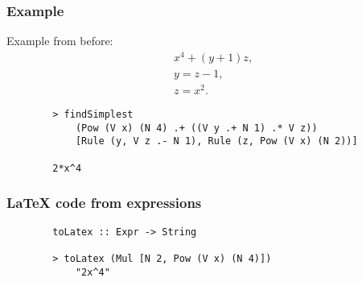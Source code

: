 \documentclass[english, 12pt, t, aspectratio=169]{beamer}
\begin{document}
\begin{frame}[fragile]
	\frametitle{Example}

	Example from before:
	\begin{align}
		&x^4 + (y + 1) z, \\
		&y = z - 1,\\
		&z = x^2.
	\end{align}
	\begin{verbatim}
		> findSimplest
		    (Pow (V x) (N 4) .+ ((V y .+ N 1) .* V z))
		    [Rule (y, V z .- N 1), Rule (z, Pow (V x) (N 2))]

		2*x^4
	\end{verbatim}
	
\end{frame}
\begin{frame}[fragile]
	\frametitle{\LaTeX{} code from expressions}

	\begin{verbatim}
		toLatex :: Expr -> String

		> toLatex (Mul [N 2, Pow (V x) (N 4)])
		    "2x^4"
	\end{verbatim}
	
\end{frame}
\end{document}
